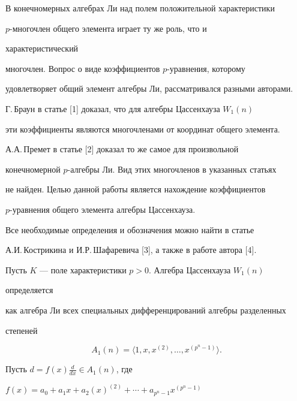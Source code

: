   


\maketitle  


  


 


В конечномерных алгебрах Ли над полем положительной характеристики 


$p$-многочлен общего элемента играет ту же роль, что и 


характеристический 


многочлен. Вопрос о виде коэффициентов $p$-уравнения, которому 


удовлетворяет общий элемент алгебры Ли, рассматривался разными авторами. 


Г.\,Браун в статье [1] доказал, что для алгебры Цассенхауза $W_1(n)$ 


эти коэффициенты являются многочленами от координат общего элемента. 


А.А.\,Премет в статье [2] доказал то же самое для произвольной 


конечномерной $p$-алгебры Ли. Вид этих многочленов в указанных статьях 


не найден. Целью данной работы является нахождение коэффициентов 


$p$-уравнения общего элемента алгебры Цассенхауза. 


 


Все необходимые определения и обозначения можно найти в статье 


А.И.\,Кострикина и И.Р.\,Шафаревича [3], а также в работе автора [4]. 


 


Пусть $K$ --- поле характеристики $p>0$. Алгебра Цассенхауза $W_1(n)$ 


определяется 


как алгебра Ли всех специальных дифференцирований алгебры разделенных 


степеней 


$$ 


A_1(n)=\langle 1,x,x^{(2)},\dotsc,x^{(p^n-1)}\rangle. 


$$ 


Пусть $d=f(x)\frac{d}{dx}\in A_1(n)$, где 


$f(x)=a_0+a_1x+a_2(x)^{(2)}+\dotsb+a_{p^n-1}x^{(p^n-1)}$ 


